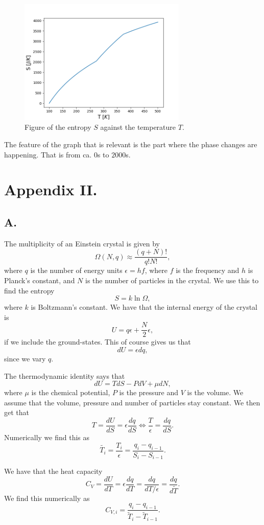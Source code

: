 \documentclass[reprint,english,notitlepage]{revtex4-1}  %
\begin{document}
\begin{figure}
\centering
\includegraphics[width=8cm]{../figures/S_mot_T.png}
\caption{Figure of the entropy $S$ against the temperature $T$.}
\label{fig:S_mot_T}
\end{figure}



The feature of the graph that is relevant is the part where the phase changes are happening. That is from ca. $0$s to $2000$s.

\section*{Appendix II.}
\subsection*{A.}
The multiplicity of an Einstein crystal is given by 
$$ \Omega(N,q)\approx \frac{(q+N)!}{q!N!},$$
 where $q$ is the number of energy units $\epsilon=hf$, where $f$ is the frequency and $h$ is Planck's constant, and $N$ is the number of particles in the crystal. We use this to find the entropy
  $$S=k\ln\Omega,$$ 
  where $k$ is Boltzmann's constant. We have that the internal energy of the crystal is 
  $$U=q\epsilon+\frac{N}{2}\epsilon,$$
  if we include the ground-states. This of course gives us that 
  $$ dU=\epsilon dq,$$
  since we vary $q$. 
  
  The thermodynamic identity says that 
  $$ dU=TdS-PdV+\mu dN,$$
  where $\mu$ is the chemical potential, $P$ is the pressure and $V$ is the volume. We assume that the volume, pressure and number of particles stay constant. We then get that
  $$T= \frac{dU}{dS}=\epsilon\frac{dq}{dS}\Leftrightarrow \frac{T}{\epsilon}=\frac{dq}{dS}.$$
  Numerically we find this as
  $$\tilde{T_i} =\frac{T_i}{\epsilon}=\frac{q_i-q_{i-1}}{S_i-S_{i-1}}.$$

We have that the heat capacity 
$$C_V=\frac{dU}{dT}=\epsilon\frac{dq}{dT}=\frac{dq}{dT/\epsilon}=\frac{dq}{d\tilde{T}}.$$
We find this numerically as 
$$ C_{V,i}=\frac{q_{i}-q_{i-1}}{\tilde{T}_i-\tilde{T}_{i-1}}.$$
\end{document}

